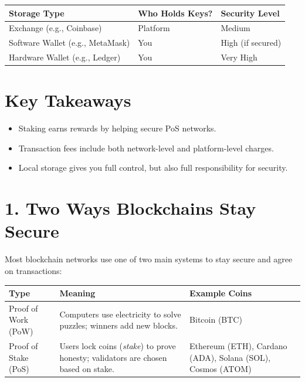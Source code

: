 \documentclass{article}
\begin{document}
\begin{center}
\begin{tabular}{|l|l|l|}
\hline
\textbf{Storage Type} & \textbf{Who Holds Keys?} & \textbf{Security Level} \\
\hline
Exchange (e.g., Coinbase) & Platform & Medium \\
Software Wallet (e.g., MetaMask) & You & High (if secured) \\
Hardware Wallet (e.g., Ledger) & You & Very High \\
\hline
\end{tabular}
\end{center}

\bigskip

\section*{Key Takeaways}
\begin{itemize}
  \item Staking earns rewards by helping secure PoS networks.
  \item Transaction fees include both network-level and platform-level charges.
  \item Local storage gives you full control, but also full responsibility for security.
\end{itemize}






\newpage


\section*{1. Two Ways Blockchains Stay Secure}

Most blockchain networks use one of two main systems to stay secure and agree on transactions:

\begin{center}
\begin{tabular}{@{}lll@{}}
\toprule
\textbf{Type} & \textbf{Meaning} & \textbf{Example Coins} \\
\midrule
Proof of Work (PoW) & Computers use electricity to solve puzzles; winners add new blocks. & Bitcoin (BTC) \\
Proof of Stake (PoS) & Users lock coins (\emph{stake}) to prove honesty; validators are chosen based on stake. & Ethereum (ETH), Cardano (ADA), Solana (SOL), Cosmos (ATOM) \\
\bottomrule
\end{tabular}
\end{center}
\end{document}
